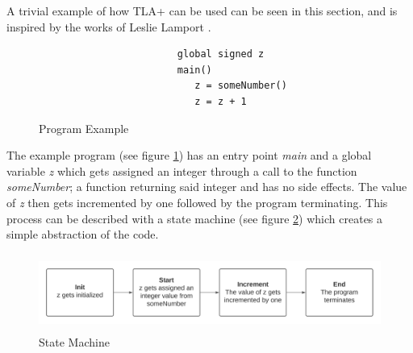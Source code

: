A trivial example of how TLA+ can be used can be seen in this section, and is inspired by the works of Leslie Lamport \cite{LAMPORTVIDEO}.


\begin{figure}[H]
 \vspace{12pt}
\begin{verbatim}
                        global signed z
                        main()
                           z = someNumber()
                           z = z + 1
\end{verbatim}
    \caption{Program Example}
    \label{fig:programexample}
\end{figure}

The example program (see figure \ref{fig:programexample}) has an entry point \textit{main} and a global variable \textit{z} which gets assigned an integer through a call to the function \textit{someNumber}; a function returning said integer and has no side effects. The value of \textit{z} then gets incremented by one followed by the program terminating. This process can be described with a state machine (see figure \ref{fig:simplestatemachine}) which creates a simple abstraction of the code.

\begin{figure}[H]
 \vspace{12pt}
\centerline{\includegraphics[width=5in, height=1in]{simplestatemachine.png}}
\caption{State Machine}
\label{fig:simplestatemachine}
\end{figure}

